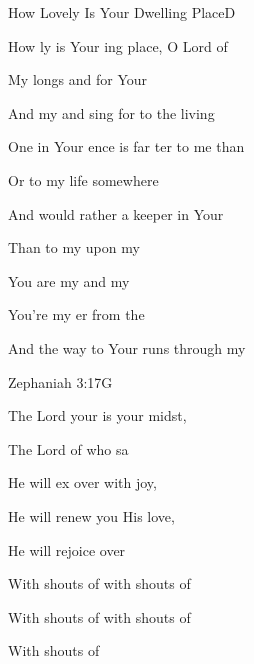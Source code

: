 \documentclass[a5paper,11pt]{book}
\newcommand{\RevDate}{\today}
\newcommand{\NotCCLIed}{\relax}
\begin{document}
\begin{song}{How Lovely Is Your Dwelling Place}{D}
  {}
  {}
  {}
  {\NotCCLIed}

  \renewcommand{\RevDate}{February~11,~1993}

  \begin{SBOpGroup}
    How ly is Your ing place,  O Lord of 
    
    My  longs and  for Your 
    
    And my  and  sing for  to the living   
    
    One  in Your ence is far ter to me than 
    
    Or to  my  life somewhere  
    
    And  would rather  a  keeper in Your 
    
    Than to  my  upon my 
    
    You are my  and my 
    
    You're my er from the 
    
    And the way to Your  runs through my  
  \end{SBOpGroup}
\end{song}


\begin{song}{Zephaniah 3:17}{G}
  {}
  {}
  {}
  {\NotCCLIed}

  \renewcommand{\RevDate}{February~11,~1993}

  \begin{SBOpGroup}
     The Lord your  is  your midst,
    
     The Lord of  who sa
    
     He will ex over  with joy,
    
     He will renew you  His love,
    
     He will rejoice over 
    
    With shouts of    with shouts of   
    
    With shouts of   with shouts of  
    
    With shouts of 
  \end{SBOpGroup}
\end{song}
\end{document}
